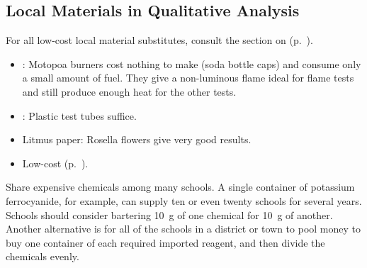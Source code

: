 \subsection{Local Materials in Qualitative Analysis}
For all low-cost local material substitutes, consult the section on  (p.~\pageref{cha:labequip}).
\begin{itemize}
\item{: Motopoa burners cost nothing to make (soda bottle caps) and consume only a small amount of fuel. They give a non-luminous flame ideal for flame tests and still produce enough heat for the other tests.}
\item{: Plastic test tubes suffice.}
\item{Litmus paper: Rosella flowers give very good results.}
\item{Low-cost  (p.~\pageref{cha:sourcesofchemicals}).}
\end{itemize} 
Share expensive chemicals among many schools. A single container of potassium ferrocyanide, for example, can supply ten or even twenty schools for several years. Schools should consider bartering 10~g of one chemical for 10~g of another. Another alternative is for all of the schools in a district or town to pool money to buy one container of each required imported reagent, and then divide the chemicals evenly. 



